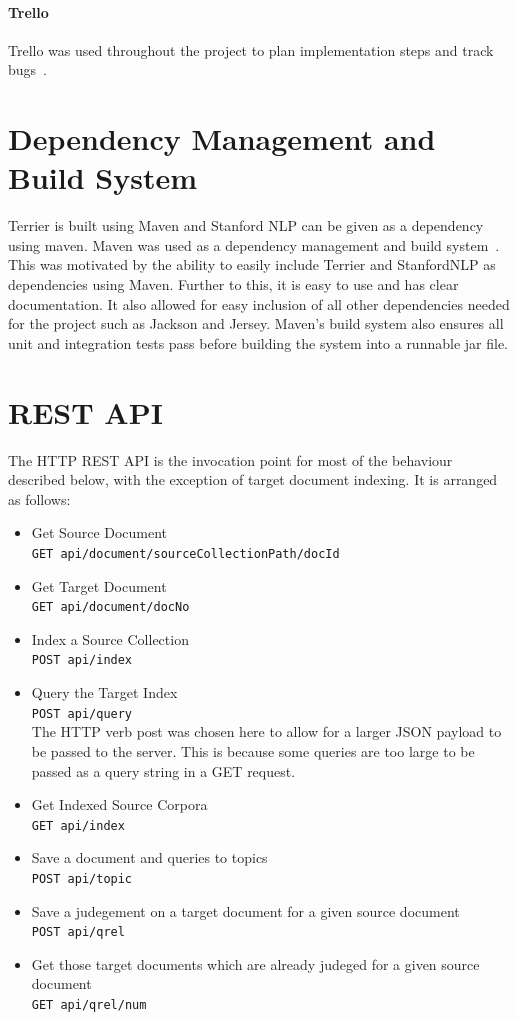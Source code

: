 \documentclass{l4proj}
\newcommand{\code}[1]{\texttt{#1}}
\begin{document}
\paragraph{Trello}
Trello was used throughout the project to plan implementation steps and track bugs~\cite{trello}.
\section{Dependency Management and Build System}
Terrier is built using Maven and Stanford NLP can be given as a dependency using maven.
Maven was used as a dependency management and build system~\cite{maven}. This was motivated by the ability to easily include Terrier and StanfordNLP as dependencies using Maven. Further to this, it is easy to use and has clear documentation. It also allowed for easy inclusion of all other dependencies needed for the project such as Jackson and Jersey. Maven's build system also ensures all unit and integration tests pass before building the system into a runnable jar file.

\section{REST API}
The HTTP REST API is the invocation point for most of the behaviour described below, with the exception of target document indexing. It is arranged as follows:
\begin{itemize}
\item Get Source Document \\
\code{GET api/document/{sourceCollectionPath}/{docId}}
\item Get Target Document \\
\code{GET api/document/{docNo}}
\item Index a Source Collection \\
\code{POST api/index}
\item Query the Target Index \\
\code{POST api/query} \\
The HTTP verb post was chosen here to allow for a larger JSON payload to be passed to the server. This is because some queries are too large to be passed as a query string in a GET request.
\item Get Indexed Source Corpora \\
\code{GET api/index}
\item Save a document and queries to topics \\
\code{POST api/topic}
\item Save a judegement on a target document for a given source document \\
\code{POST api/qrel}
\item Get those target documents which are already judeged for a given source document \\
\code{GET api/qrel/{num}}
\end{itemize}
\end{document}
